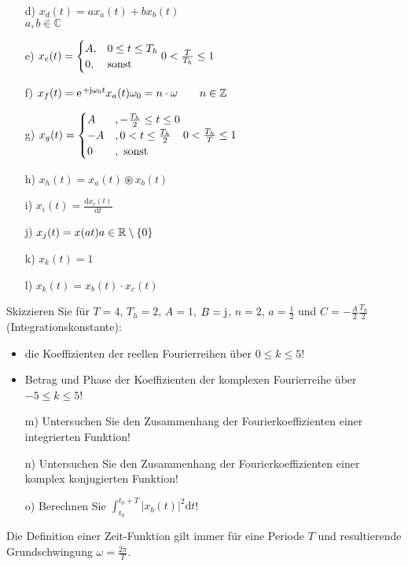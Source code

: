 \documentclass[11pt,a4paper,DIV=12]{scrartcl}
\newcommand{\diff}{\mathrm{d}}
\begin{document}
\begin{itemize}
	\item[d) ] $x_d(t) = ax_{a}(t)+bx_{b}(t)$\\
				$a,b\in\mathbb{C}$
	\item[e) ] $x_{e}(t)=
				\begin{cases}
					A, &0\leq t\leq T_h\\
					0, &\text{sonst}
				\end{cases}\\
				0< \frac{T}{T_h}\leq 1$
	\item[f) ] $x_{f}(t)=\e^{+\im\omega_0 t}x_{a}(t)\\
			  	\omega_0 = n\cdot \omega \quad \quad n\in\mathbb{Z}$
	\item[g) ] $x_{g}(t) =
				\begin{cases}
					A &, -\frac{T_h}{2}\leq t \leq 0 \\
					-A &, 0<t\leq \frac{T_h}{2}\\
					0 &,\text{ sonst}
				\end{cases}\\
				0<\frac{T_h}{T}\leq 1$
	\item[h) ] $x_{h}(t) = x_{a}(t)\circledast x_{b}(t)$
	\item[i) ]$x_{i}(t)=\frac{\diff x_{c}(t)}{\diff t}$
	\item[j) ] $x_{j}(t)=x(at)\\
				a\in\mathbb{R}\setminus\{0\}$
	\item[k) ]$x_{k}(t)=1$
	\item[l) ] $x_{k}(t)=x_{b}(t)\cdot x_{c}(t)$
\end{itemize}
%
Skizzieren Sie für $T=4$, $T_h=2$, $A=1$, $B=\im$, $n= 2$, $a=\frac{1}{2}$ und $C=-\frac{A}{2}\frac{T_h}{2}$ (Integrationskonstante):
%
\begin{itemize}
	\item die Koeffizienten der reellen Fourierreihen über $0\leq k \leq 5$!
	\item Betrag und Phase der Koeffizienten der komplexen Fourierreihe über
	$-5\leq k \leq 5$!
\end{itemize}
%
\begin{itemize}
	\item[m) ] Untersuchen Sie den Zusammenhang der Fourierkoeffizienten einer
	integrierten Funktion!
	\item[n) ] Untersuchen Sie den Zusammenhang der Fourierkoeffizienten einer
	komplex konjugierten Funktion!
	\item[o) ] Berechnen Sie $\int_{t_0}^{t_0+T}|x_b(t)|^2\diff t$!
\end{itemize}
%
Die Definition einer Zeit-Funktion gilt immer für eine Periode $T$ und resultierende
Grundschwingung $\omega = \frac{2\pi}{T}$.
\end{document}

